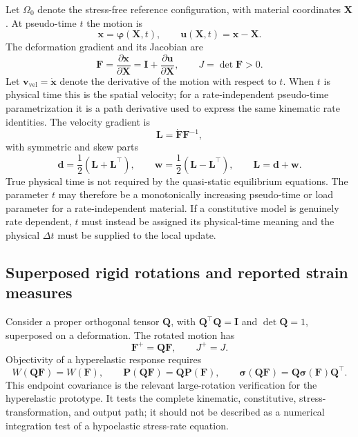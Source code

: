 \documentclass[11pt,a4paper]{article}
\newcommand{\bs}[1]{\boldsymbol{#1}}
\newcommand{\I}{\bs{I}}
\newcommand{\F}{\bs{F}}
\newcommand{\Pstress}{\bs{P}}
\newcommand{\sig}{\bs{\sigma}}
\newcommand{\Lten}{\bs{L}}
\newcommand{\dten}{\bs{d}}
\newcommand{\wten}{\bs{w}}
\begin{document}
Let $\Omega_0$ denote the stress-free reference configuration, with material coordinates $\bs{X}$. At pseudo-time $t$ the motion is
\begin{equation}
\bs{x}=\bs{\varphi}(\bs{X},t),
\qquad
\bs{u}(\bs{X},t)=\bs{x}-\bs{X}.
\end{equation}
The deformation gradient and its Jacobian are
\begin{equation}
\F=\frac{\partial\bs{x}}{\partial\bs{X}}
=\I+\frac{\partial\bs{u}}{\partial\bs{X}},
\qquad
J=\det\F>0.
\end{equation}
Let $\bs v_{\mathrm{vel}}=\dot{\bs x}$ denote the derivative of the motion with respect to $t$. When $t$ is physical time this is the spatial velocity; for a rate-independent pseudo-time parametrization it is a path derivative used to express the same kinematic rate identities. The velocity gradient is
\begin{equation}
\Lten=\dot{\F}\F^{-1},
\end{equation}
with symmetric and skew parts
\begin{equation}
\dten=\frac{1}{2}(\Lten+\Lten^\top),
\qquad
\wten=\frac{1}{2}(\Lten-\Lten^\top),
\qquad
\Lten=\dten+\wten.
\end{equation}
True physical time is not required by the quasi-static equilibrium equations. The parameter $t$ may therefore be a monotonically increasing pseudo-time or load parameter for a rate-independent material. If a constitutive model is genuinely rate dependent, $t$ must instead be assigned its physical-time meaning and the physical $\Delta t$ must be supplied to the local update.

\subsection{Superposed rigid rotations and reported strain measures}

Consider a proper orthogonal tensor $\bs Q$, with $\bs Q^\top\bs Q=\I$ and $\det\bs Q=1$, superposed on a deformation. The rotated motion has
\begin{equation}
\F^+=\bs Q\F,
\qquad
J^+=J.
\end{equation}
Objectivity of a hyperelastic response requires
\begin{equation}
W(\bs Q\F)=W(\F),
\qquad
\Pstress(\bs Q\F)=\bs Q\Pstress(\F),
\qquad
\sig(\bs Q\F)=\bs Q\sig(\F)\bs Q^\top.
\label{eq:superposed-rotation-stress}
\end{equation}
This endpoint covariance is the relevant large-rotation verification for the hyperelastic prototype. It tests the complete kinematic, constitutive, stress-transformation, and output path; it should not be described as a numerical integration test of a hypoelastic stress-rate equation.
\end{document}
